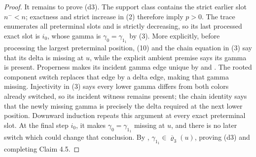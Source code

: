 \begin{proof}
It remains to prove (d3).  The support class contains the strict earlier
slot \(n^-<n\); exactness and strict increase in (2) therefore imply
\(p>0\).  The trace enumerates all preterminal slots and is strictly
decreasing, so its last processed exact slot is \(i_0\), whose gamma is
\(\gamma_0=\gamma_{1_1}\) by (3).  More explicitly, before processing the
largest preterminal position, (10) and the chain equation in (3) say that
its delta is missing at \(u\), while the explicit ambient premise says its
gamma is present.  Properness makes its incident gamma edge unique by
 and .  The rooted
component switch replaces that edge by a delta edge, making that gamma
missing.  Injectivity in (3) says every lower gamma differs from both colors
already switched, so its incident witness remains present; the chain
identity says that the newly missing gamma is precisely the delta required
at the next lower position.  Downward induction repeats this argument at
every exact preterminal slot.  At the final step \(i_0\), it makes
\(\gamma_0=\gamma_{1_1}\) missing at \(u\), and there is no later switch
which could change that conclusion.  By ,
\(\gamma_{1_1}\in\overline{\varrho}_3(u)\), proving (d3) and completing
Claim 4.5.
\end{proof}

